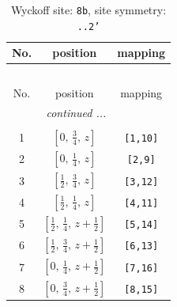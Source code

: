 \documentclass[fleqn,8pt]{jsarticle}
\begin{document}
\begin{longtable}{ccc}
\caption{Wyckoff site: {\tt 8b}, site symmetry: {\tt ..2'}}
 \\
 \hline \hline
No. & position & mapping \\ \hline \endfirsthead

\multicolumn{2}{l}{\tablename\ \thetable{}} \\
 \hline \hline
No. & position & mapping \\ \hline \endhead

 \hline \hline
\multicolumn{2}{r}{\footnotesize\it continued ...} \\ \endfoot

 \hline \hline
\multicolumn{2}{r}{} \\ \endlastfoot

1 & $\left[ 0,\, \frac{3}{4},\, z \right]$ & {\tt [1,10]} \\ \hline
2 & $\left[ 0,\, \frac{1}{4},\, z \right]$ & {\tt [2,9]} \\ \hline
3 & $\left[ \frac{1}{2},\, \frac{3}{4},\, z \right]$ & {\tt [3,12]} \\ \hline
4 & $\left[ \frac{1}{2},\, \frac{1}{4},\, z \right]$ & {\tt [4,11]} \\ \hline
5 & $\left[ \frac{1}{2},\, \frac{1}{4},\, z + \frac{1}{2} \right]$ & {\tt [5,14]} \\ \hline
6 & $\left[ \frac{1}{2},\, \frac{3}{4},\, z + \frac{1}{2} \right]$ & {\tt [6,13]} \\ \hline
7 & $\left[ 0,\, \frac{1}{4},\, z + \frac{1}{2} \right]$ & {\tt [7,16]} \\ \hline
8 & $\left[ 0,\, \frac{3}{4},\, z + \frac{1}{2} \right]$ & {\tt [8,15]} \\
\end{longtable}
\renewcommand{\arraystretch}{1.2}
\end{document}
